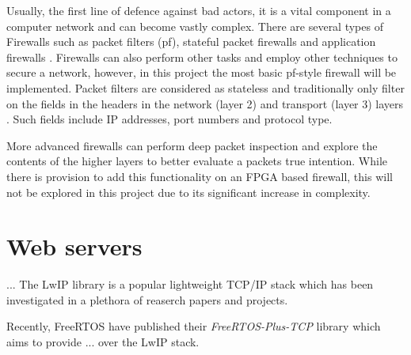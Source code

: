 Usually, the first line of defence against bad actors, it is a vital component in a computer network and can become vastly complex. There are several
types of Firewalls such as packet filters (pf), stateful packet firewalls and application firewalls \cite{FirewallsBook}. Firewalls can also perform 
other tasks and employ other techniques to secure a network, however, in this project the most basic pf-style firewall will be implemented. 
Packet filters are considered as stateless and traditionally only filter on the fields in the headers in the network (layer 2) and transport 
(layer 3) layers \cite{FirewallsBook}. Such fields include IP addresses, port numbers and protocol type.

More advanced firewalls can perform deep packet inspection and explore the contents of the higher layers to better evaluate a packets true intention. 
While there is provision to add this functionality on an FPGA based firewall, this will not be explored in this project due to its significant increase 
in complexity. 


\section{Web servers}
... The LwIP library is a popular lightweight TCP/IP stack which has been investigated in a plethora of reaserch papers and projects. 


Recently, FreeRTOS have published their \textit{FreeRTOS-Plus-TCP} library which aims to provide ... over the LwIP stack. 






